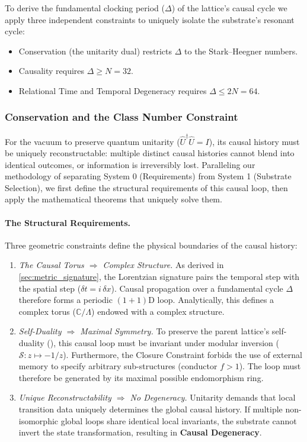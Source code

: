 To derive the fundamental clocking period ($\Delta$) of the lattice's causal cycle we apply three independent constraints to uniquely isolate the substrate's resonant cycle:

\begin{itemize}
    \item Conservation (the unitarity dual) restricts $\Delta$ to the Stark--Heegner numbers.
    \item Causality requires $\Delta \geq N = 32$.
    \item Relational Time and Temporal Degeneracy requires $\Delta \leq 2N = 64$.
\end{itemize}

\subsubsection{Conservation and the Class Number Constraint}
\label{sec:fundamental_resonance_filter1}
For the vacuum to preserve quantum unitarity ($\hat{U}^\dagger\hat{U} = I$), its causal history must be uniquely reconstructable: multiple distinct causal histories cannot blend into identical outcomes, or information is irreversibly lost. Paralleling our methodology of separating System 0 (Requirements) from System 1 (Substrate Selection), we first define the structural requirements of this causal loop, then apply the mathematical theorems that uniquely solve them.

\paragraph{The Structural Requirements.} Three geometric constraints define the physical boundaries of the causal history:
\begin{enumerate}
    \item[\textbf{(R1)}] \emph{The Causal Torus $\Rightarrow$ Complex Structure.} As derived in \cref{sec:metric_signature}, the Lorentzian signature pairs the temporal step with the spatial step ($\delta t = i\,\delta x$). Causal propagation over a fundamental cycle $\Delta$ therefore forms a periodic $(1+1)$D loop. Analytically, this defines a complex torus ($\mathbb{C}/\Lambda$) endowed with a complex structure.
    
    \item[\textbf{(R2)}] \emph{Self-Duality $\Rightarrow$ Maximal Symmetry.} To preserve the parent lattice's self-duality (), this causal loop must be invariant under modular inversion ($\mathcal{S}: z \mapsto -1/z$). Furthermore, the Closure Constraint forbids the use of external memory to specify arbitrary sub-structures (conductor $f>1$). The loop must therefore be generated by its maximal possible endomorphism ring.
    
    \item[\textbf{(R3)}] \emph{Unique Reconstructability $\Rightarrow$ No Degeneracy.} Unitarity demands that local transition data uniquely determines the global causal history. If multiple non-isomorphic global loops share identical local invariants, the substrate cannot invert the state transformation, resulting in \textbf{Causal Degeneracy}.
\end{enumerate}

